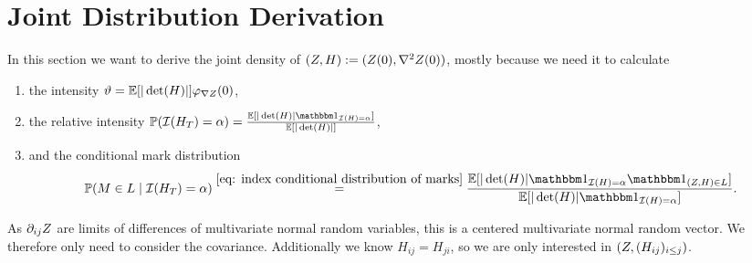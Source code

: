 \section{Joint Distribution Derivation}


In this section we want to derive the joint density of \((Z, H):=
(Z(0), \nabla^2Z(0))\), mostly because we need it to calculate
\begin{enumerate}
	\item the intensity \(\vartheta = \mathbb{E}[|\det(H)|]\varphi_{\nabla Z}(0)\),
	\item the relative intensity \(\Pr(\negEV(H_T) = \alpha) =
	\frac{\E[|\det(H)|\ind_{\negEV(H)=\alpha}]}{\E[|\det(H)|]} \),
	\item and the conditional mark distribution
	\[
		\Pr(\Mark\in L\mid \negEV(H_T) = \alpha)
		\overset{\eqref{eq: index conditional distribution of marks}}= \frac{
			\E[|\det(H)|\ind_{\negEV(H) = \alpha}\ind_{(Z,H)\in L}]
		}{\E[|\det(H)|\ind_{\negEV(H) = \alpha}]}.
	\]
\end{enumerate}
As \(\partial_{ij}Z\) are limits of differences of multivariate
normal random variables, this is a centered multivariate normal
random vector. We therefore only need to consider the covariance. Additionally
we know \(H_{ij} = H_{ji}\), so we are only interested
in \((Z, (H_{ij})_{i\le j})\).

